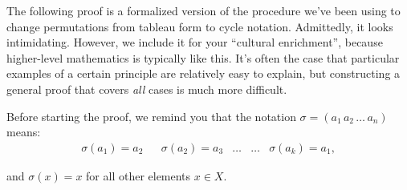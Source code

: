 \noindent
The following  proof is a formalized version of the procedure we've been using to change permutations from tableau form to cycle notation.
Admittedly, it looks intimidating. However, we include it for your ``cultural enrichment'', because higher-level  mathematics is typically  like this. It's often the case that  particular examples of a certain principle are relatively easy to explain, but constructing a  general proof that covers \emph{all} cases is much more difficult.

\noindent
Before starting the proof, we remind you   that the notation $\sigma = (a_1 \, a_2 \, \ldots \, a_n)$ means:
\begin{align*}
\sigma( a_1 )  = a_2  & &
\sigma( a_2 )  = a_3 & 
 \ldots   & \ldots & 
\sigma( a_k )  = a_1,
\end{align*}

\noindent
and $\sigma( x) =x$ for all other elements $x \in X$.



